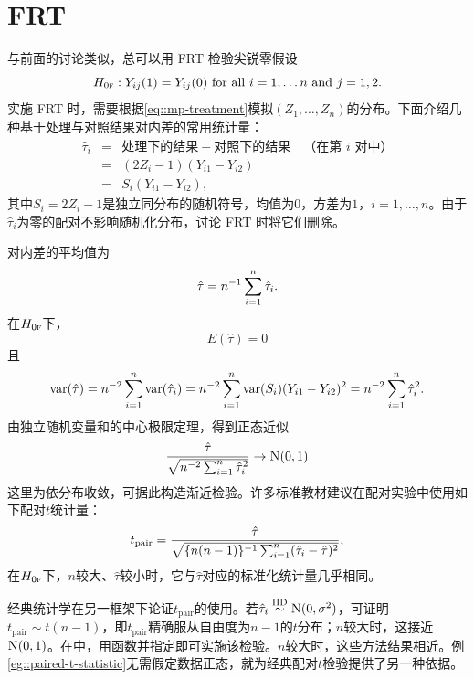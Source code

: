  
\section{FRT}
 
 与前面的讨论类似，总可以用 FRT 检验尖锐零假设
$$
H_{0\textsc{f}}: Y_{ij}(1) = Y_{ij}(0)  \text{ for all }  i=1,\ldots  n  \text{ and } j=1,2. 
$$
实施 FRT 时，需要根据\eqref{eq::mp-treatment}模拟$(Z_1, \ldots, Z_n)$的分布。下面介绍几种基于处理与对照结果对内差的常用统计量：
\begin{eqnarray*}
\hat{\tau}_i &=& \text{处理下的结果} - \text{对照下的结果}\quad\text{（在第 } i \text{ 对中）} \\
&=&  (2Z_i - 1) (Y_{i1}  - Y_{i2})\\
&=& S_i (Y_{i1}  - Y_{i2})  , 
\end{eqnarray*}
其中$S_i = 2Z_i - 1$是独立同分布的随机符号，均值为$0$，方差为$1$，$i=1,\ldots, n$。由于$\hat{\tau}_i $为零的配对不影响随机化分布，讨论 FRT 时将它们删除。 
 
\begin{example} 
[配对$t$统计量]\label{eg::paired-t-statistic}
对内差的平均值为
$$
\hat{\tau} = n^{-1}  \sum_{i=1}^n \hat{\tau}_i .
$$
在$H_{0\textsc{f}}$下，
$$
E(\hat{\tau} ) = 0
$$
且
$$
\textup{var}(  \hat{\tau}   ) 
= n^{-2} \sum_{i=1}^n \textup{var}(  \hat{\tau}_i ) 
= n^{-2} \sum_{i=1}^n \textup{var}(S_i) (Y_{i1}  - Y_{i2})^2 =  n^{-2} \sum_{i=1}^n  \hat{\tau}_i^2 . 
$$
由独立随机变量和的中心极限定理，得到正态近似
$$
\frac{  \hat{\tau}  }{ \sqrt{  n^{-2} \sumn  \hat{\tau}_i^2 } } \rightarrow \N01 
$$
这里为依分布收敛，可据此构造渐近检验。许多标准教材建议在配对实验中使用如下配对$t$统计量：
$$
t_\text{pair} = \frac{  \hat{\tau}  }{ \sqrt{  \{ n(n-1) \}^{-1} \sum_{i=1}^n  (\hat{\tau}_i - \hat{\tau} ) ^2 } },
$$
在$H_{0\textsc{f}}$下，$n$较大、$\hat{\tau} $较小时，它与$\hat{\tau}$对应的标准化统计量几乎相同。 
\end{example} 

经典统计学在另一框架下论证$t_\text{pair}$的使用。若$\hat{\tau}_i \stackrel{\textup{IID}}{\sim} \textsc{N}(0, \sigma^2)$，可证明$t_\text{pair} \sim t(n-1)$，即$t_\text{pair} $精确服从自由度为$n-1$的$t$分布；$n$较大时，这接近$\N01$。在中，用函数并指定即可实施该检验。$n$较大时，这些方法结果相近。例\ref{eg::paired-t-statistic}无需假定数据正态，就为经典配对$t$检验提供了另一种依据。 

 
 
 

 
 

